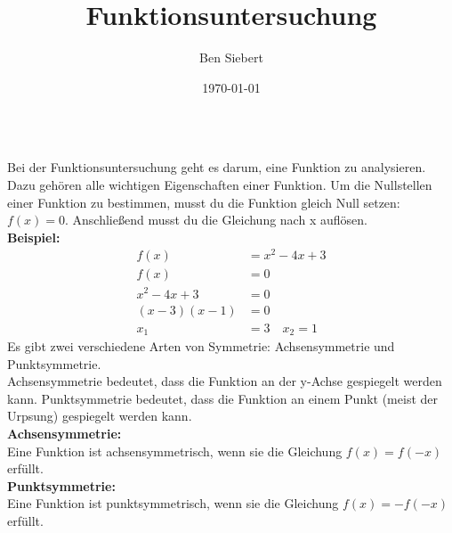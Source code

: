 \documentclass[25pt, a3paper, portrait]{tikzposter}
\title{Funktionsuntersuchung}
\author{Ben Siebert}
\date{\today}
\institute{Gymnasium Holthausen Hattingen}
\begin{document}
\maketitle
\begin{columns}
    {Bei der Funktionsuntersuchung geht es darum, eine Funktion zu analysieren.
        Dazu gehören alle wichtigen Eigenschaften einer Funktion.
    }
    {
        Um die Nullstellen einer Funktion zu bestimmen, musst du die Funktion gleich Null setzen: $f(x) = 0$.
        Anschließend musst du die Gleichung nach x auflösen. \\
        \textbf{Beispiel:}
        \begin{align*}
            f(x)           & = x^2 - 4x + 3    \\
            f(x)           & = 0               \\
            x^2 - 4x + 3   & = 0               \\
            (x - 3)(x - 1) & = 0               \\
            x_1            & = 3 \quad x_2 = 1
        \end{align*}
    }
    {
        Es gibt zwei verschiedene Arten von Symmetrie: Achsensymmetrie und Punktsymmetrie. \\
        Achsensymmetrie bedeutet, dass die Funktion an der y-Achse gespiegelt werden kann.
        Punktsymmetrie bedeutet, dass die Funktion an einem Punkt (meist der Urpsung) gespiegelt werden kann. \\
        \textbf{Achsensymmetrie:} \\
        Eine Funktion ist achsensymmetrisch, wenn sie die Gleichung $f(x) = f(-x)$ erfüllt. \\
        \textbf{Punktsymmetrie:} \\
        Eine Funktion ist punktsymmetrisch, wenn sie die Gleichung $f(x) = -f(-x)$ erfüllt. \\
    }
\end{columns}
\end{document}
